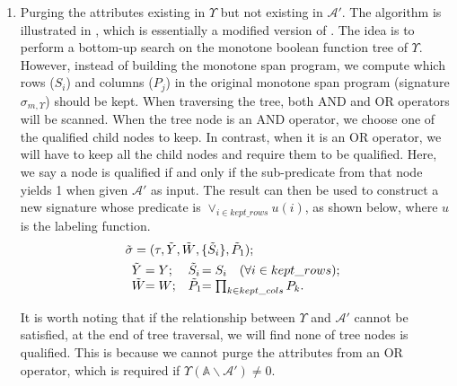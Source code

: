 \begin{enumerate}
  \item Purging the attributes existing in $\Upsilon$ but not existing in $\mathcal{A}'$.
    The algorithm is illustrated in , which is essentially a modified version of .
    The idea is to perform a bottom-up search on the monotone boolean function tree of $\Upsilon$. However, instead of building the monotone span program, we compute which rows ($S_i$) and columns ($P_j$) in the original monotone span program (signature $\sigma_{m, \Upsilon}$) should be kept. When traversing the tree, both AND and OR operators will be scanned. When the tree node is an AND operator, we choose one of the qualified child nodes to keep. In contrast, when it is an OR operator, we will have to keep all the child nodes and require them to be qualified. Here, we say a node is qualified if and only if the sub-predicate from that node yields 1 when given $\mathcal{A}'$ as input. The result  can then be used to construct a new signature whose predicate is $\lor_{i \in kept\_rows} u(i)$, as shown below, where $u$ is the labeling function.
    \begin{align*}
              & \tilde{\sigma} = (\tau, \tilde{Y},\tilde{W},\{\tilde{S}_i\}, \tilde{P}_1); \\
              &\begin{array}{l@{}ll@{}l}
                \tilde{Y} & = Y; &
                \tilde{S}_i & = S_i \quad (\forall i \in kept\_rows);
                \\
                \tilde{W} & = W; &
                \tilde{P}_1 & = \prod_{k \in kept\_cols}{P_k}.
              \end{array}
    \end{align*}

    It is worth noting that if the relationship between $\Upsilon$ and $\mathcal{A}'$ cannot be satisfied, at the end of tree traversal, we will find none of tree nodes is qualified. This is because we cannot purge the attributes from an OR operator, which is required if $\Upsilon(\mathbb{A}\backslash\mathcal{A}') \neq 0$.


\end{enumerate}
